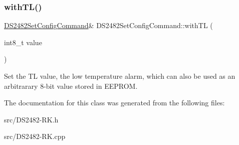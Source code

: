 \subsubsection{\texorpdfstring{with\+T\+L()}{withTL()}}
{\footnotesize\ttfamily \mbox{\hyperlink{class_d_s2482_set_config_command}{D\+S2482\+Set\+Config\+Command}}\& D\+S2482\+Set\+Config\+Command\+::with\+TL (\begin{DoxyParamCaption}\item[{int8\+\_\+t}]{value }\end{DoxyParamCaption})\hspace{0.3cm}{\ttfamily [inline]}}

Set the TL value, the low temperature alarm, which can also be used as an arbitrarary 8-\/bit value stored in E\+E\+P\+R\+OM. 

The documentation for this class was generated from the following files\+:\begin{DoxyCompactItemize}
\item 
src/D\+S2482-\/\+R\+K.\+h\item 
src/D\+S2482-\/\+R\+K.\+cpp\end{DoxyCompactItemize}
